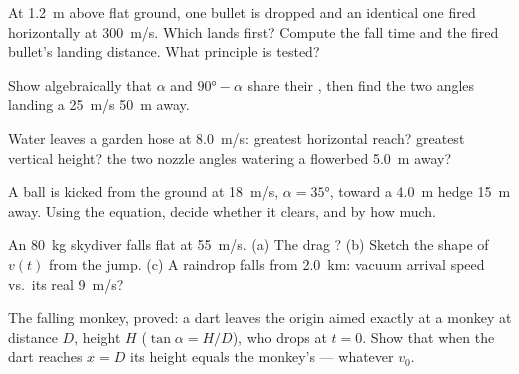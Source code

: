 \begin{exercise}[$\star\star$]\label{exo:g12:projectile-motion:10}
At \qty{1.2}{m} above flat ground, one bullet is dropped and an identical
one fired horizontally at \qty{300}{m/s}. Which lands first? Compute the
fall time and the fired bullet's landing distance. What principle is
tested?
\end{exercise}

\begin{exercise}[$\star\star$]\label{exo:g12:projectile-motion:11}
Show algebraically that $\alpha$ and $\ang{90} - \alpha$ share their
, then find the two angles landing a \qty{25}{m/s} 
\qty{50}{m} away.
\end{exercise}

\begin{exercise}[$\star\star\star$]\label{exo:g12:projectile-motion:12}
Water leaves a garden hose at \qty{8.0}{m/s}: greatest horizontal reach?
greatest vertical height? the two nozzle angles watering a flowerbed
\qty{5.0}{m} away?
\end{exercise}

\begin{exercise}[$\star\star\star$]\label{exo:g12:projectile-motion:13}
A ball is kicked from the ground at \qty{18}{m/s}, $\alpha = \ang{35}$,
toward a \qty{4.0}{m} hedge \qty{15}{m} away. Using the 
equation, decide whether it clears, and by how much.
\end{exercise}

\begin{exercise}[$\star\star\star$]\label{exo:g12:projectile-motion:14}
An \qty{80}{kg} skydiver falls flat at  \qty{55}{m/s}.
(a) The drag ? (b) Sketch the shape of $v(t)$ from the jump. (c) A
raindrop falls from \qty{2.0}{km}: vacuum arrival speed vs.\ its real
\qty{9}{m/s}?
\end{exercise}

\begin{exercise}[$\star\star\star$]\label{exo:g12:projectile-motion:15}
The falling monkey, proved: a dart leaves the origin aimed exactly at a
monkey at distance $D$, height $H$ ($\tan\alpha = H/D$), who drops at
$t = 0$. Show that when the dart reaches $x = D$ its height equals the
monkey's --- whatever $v_0$.
\end{exercise}

